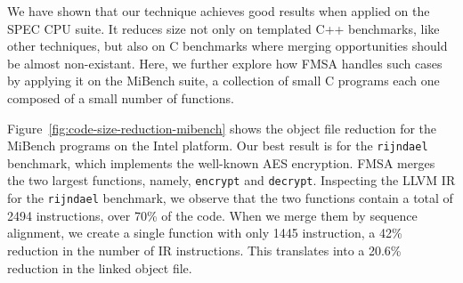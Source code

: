 We have shown that our technique achieves good results when applied on the SPEC
CPU suite. It reduces size not only on templated C++ benchmarks, like other
techniques, but also on C benchmarks where merging opportunities should
be almost non-existant. Here, we further explore how FMSA handles such
cases by applying it on the MiBench suite, a collection of small C programs
each one composed of a small number of functions. 

Figure~\ref{fig:code-size-reduction-mibench} shows the object file reduction
for the MiBench programs on the Intel platform. Our best result is for the \texttt{rijndael} benchmark,
which implements the well-known AES encryption. FMSA merges the two largest functions, namely,
\texttt{encrypt} and \texttt{decrypt}.
Inspecting the LLVM IR for the \texttt{rijndael} benchmark, we observe that
the two functions contain a total of 2494 instructions, over 70\% of the code.
When we merge them by sequence alignment, we create a single function with
only 1445 instruction, a 42\% reduction in the number of IR instructions. This
translates into a 20.6\% reduction in the linked object file.

